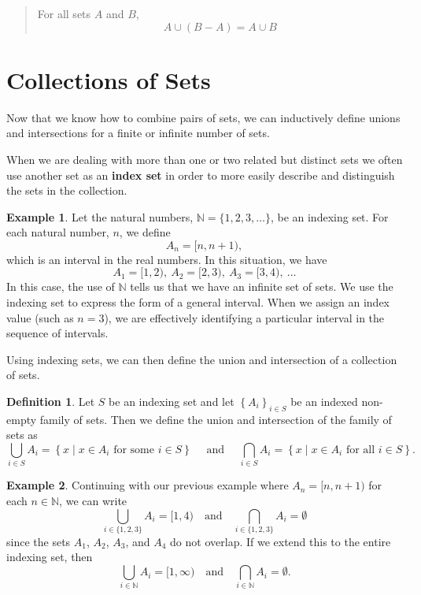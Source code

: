\documentclass[
]{book}
\theoremstyle{definition}
\newtheorem{definition}{Definition}[chapter]
\theoremstyle{definition}
\newtheorem{example}{Example}[chapter]
\theoremstyle{definition}
\theoremstyle{remark}
\begin{document}
\begin{quote}
For all sets \(A\) and \(B\), \[A \cup (B-A)= A \cup B\]
\end{quote}

\hypertarget{collections-of-sets}{%
\section{Collections of Sets}\label{collections-of-sets}}

Now that we know how to combine pairs of sets, we can inductively define unions and intersections for a finite or infinite number of sets.

When we are dealing with more than one or two related but distinct sets we often use another set as an \textbf{index set} in order to more easily describe and distinguish the sets in the collection.

\begin{example}
\protect\hypertarget{exm:unnamed-chunk-29}{}{\label{exm:unnamed-chunk-29} }Let the natural numbers, \(\mathbb{N}=\{1, 2, 3, \ldots \}\), be an indexing set. For each natural number, \(n\), we define \[A_n = [n,n+1),\] which is an interval in the real numbers. In this situation, we have
\[A_1 = [1,2), \:  A_2 = [2,3), \: A_3 = [3,4),\:  \ldots \]
In this case, the use of \(\mathbb{N}\) tells us that we have an infinite set of sets. We use the indexing set to express the form of a general interval. When we assign an index value (such as \(n=3\)), we are effectively identifying a particular interval in the sequence of intervals.
\end{example}

Using indexing sets, we can then define the union and intersection of a collection of sets.

\begin{definition}
\protect\hypertarget{def:unnamed-chunk-30}{}{\label{def:unnamed-chunk-30} } Let \(S\) be an indexing set and let \(\left\{ A_i\right\}_{i\in S}\) be an indexed non-empty family of sets. Then we define the union and intersection of the family of sets as
\[\bigcup_{i\in S} A_i = \left\{ x \middle \vert x\in A_i \mbox{ for some } i\in S\right\} \quad \mbox{ and } \quad \bigcap_{i\in S} A_i = \left\{ x\middle \vert x\in A_i \mbox{ for all } i \in S\right\}.\]
\end{definition}

\begin{example}
\protect\hypertarget{exm:disjoint}{}{\label{exm:disjoint} }Continuing with our previous example where \(A_n= [n,n+1)\) for each \(n\in \mathbb{N}\), we can write
\[ \bigcup_{i\in \{1,2,3\}} A_i = [1,4) \quad \mbox{and} \quad \bigcap_{i\in \{1,2,3\}} A_i = \emptyset\]
since the sets \(A_1\), \(A_2\), \(A_3\), and \(A_4\) do not overlap. If we extend this to the entire indexing set, then \[\bigcup_{i\in \mathbb{N}} A_i = [1,\infty) \quad \mbox{and} \quad \bigcap_{i\in \mathbb{N}} A_i = \emptyset.\]
\end{example}
\end{document}
